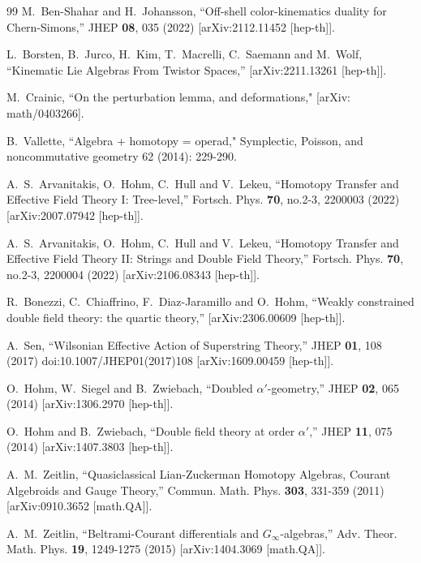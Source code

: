\documentclass[12pt]{article}\pdfoutput=1
\begin{document}
\begin{thebibliography}{99}
M.~Ben-Shahar and H.~Johansson,
``Off-shell color-kinematics duality for Chern-Simons,''
JHEP \textbf{08}, 035 (2022)
[arXiv:2112.11452 [hep-th]].



L.~Borsten, B.~Jurco, H.~Kim, T.~Macrelli, C.~Saemann and M.~Wolf,
``Kinematic Lie Algebras From Twistor Spaces,''
[arXiv:2211.13261 [hep-th]].


M.~Crainic, 
``On the perturbation lemma, and deformations," 
[arXiv: math/0403266]. 

B.~Vallette,  ``Algebra + homotopy = operad," 
Symplectic, Poisson, and noncommutative geometry 62 (2014): 229-290.


A.~S.~Arvanitakis, O.~Hohm, C.~Hull and V.~Lekeu,
``Homotopy Transfer and Effective Field Theory I: Tree-level,''
Fortsch. Phys. \textbf{70}, no.2-3, 2200003 (2022)
[arXiv:2007.07942 [hep-th]].

A.~S.~Arvanitakis, O.~Hohm, C.~Hull and V.~Lekeu,
``Homotopy Transfer and Effective Field Theory II: Strings and Double Field Theory,''
Fortsch. Phys. \textbf{70}, no.2-3, 2200004 (2022)
[arXiv:2106.08343 [hep-th]].


R.~Bonezzi, C.~Chiaffrino, F.~Diaz-Jaramillo and O.~Hohm,
``Weakly constrained double field theory: the quartic theory,''
[arXiv:2306.00609 [hep-th]].


A.~Sen,
``Wilsonian Effective Action of Superstring Theory,''
JHEP \textbf{01}, 108 (2017)
doi:10.1007/JHEP01(2017)108
[arXiv:1609.00459 [hep-th]].

O.~Hohm, W.~Siegel and B.~Zwiebach,
``Doubled $\alpha'$-geometry,''
JHEP \textbf{02}, 065 (2014)
[arXiv:1306.2970 [hep-th]].

O.~Hohm and B.~Zwiebach,
``Double field theory at order $\alpha'$,''
JHEP \textbf{11}, 075 (2014)
[arXiv:1407.3803 [hep-th]].

A.~M.~Zeitlin,
``Quasiclassical Lian-Zuckerman Homotopy Algebras, Courant Algebroids and Gauge Theory,''
Commun. Math. Phys. \textbf{303}, 331-359 (2011)
[arXiv:0910.3652 [math.QA]].

A.~M.~Zeitlin,
``Beltrami-Courant differentials and $G_{\infty}$-algebras,''
Adv. Theor. Math. Phys. \textbf{19}, 1249-1275 (2015)
[arXiv:1404.3069 [math.QA]].

 \end{thebibliography}
\end{document}
